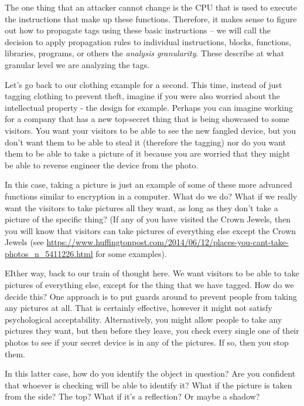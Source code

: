 The one thing that an attacker cannot change is the CPU that is used to execute the instructions that
make up these functions. Therefore, it makes sense to figure out how to propagate tags using these
basic instructions -- we will call the decision to apply propagation rules to individual instructions, blocks,
functions, libraries, programs, or others the {\em analysis granularity}. These describe at what granular level we are analyzing the tags.

Let’s go back to our clothing example for a second. This time, instead of just tagging clothing to prevent
theft, imagine if you were also worried about the intellectual property - the design for example. Perhaps
you can imagine working for a company that has a new top-secret thing that is being showcased to some
visitors. You want your visitors to be able to see the new fangled device, but you don’t want them to be
able to steal it (therefore the tagging) nor do you want them to be able to take a picture of it because
you are worried that they might be able to reverse engineer the device from the photo.

In this case, taking a picture is just an example of some of these more advanced functions similar to
encryption in a computer. What do we do? What if we really want the visitors to take pictures all they
want, as long as they don’t take a picture of the specific thing? (If any of you have visited the Crown
Jewels, then you will know that visitors can take pictures of everything else except the Crown Jewels (see
\url{https://www.huffingtonpost.com/2014/06/12/places-you-cant-take-photos_n_5411226.html} for some
examples).

EIther way, back to our train of thought here. We want visitors to be able to take pictures of everything
else, except for the thing that we have tagged. How do we decide this? One approach is to put guards
around to prevent people from taking any pictures at all. That is certainly effective, however it might not
satisfy psychological acceptability. Alternatively, you might allow people to take any pictures they want,
but then before they leave, you check every single one of their photos to see if your secret device is in
any of the pictures. If so, then you stop them.

In this latter case, how do you identify the object in question? Are you confident that whoever is
checking will be able to identify it? What if the picture is taken from the side? The top? What if it’s a
reflection? Or maybe a shadow?


